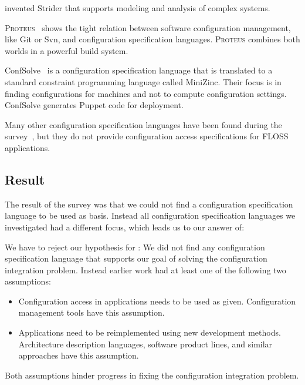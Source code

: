 \citet{lock2005strider} invented Strider that supports modeling and analysis of complex systems.

\textsc{Proteus}~\cite{tryggeseth1995modelling} shows the tight relation between software configuration management, like Git or Svn, and configuration specification languages.
\textsc{Proteus} combines both worlds in a powerful build system.

ConfSolve~\cite{hewson2011modelling,hewson2012declarative} is a configuration specification language that is translated to a standard constraint programming language called MiniZinc.
Their focus is in finding configurations for machines and not to compute configuration settings.
ConfSolve generates Puppet code for deployment.

Many other configuration specification languages have been found during the survey~\cite{roll2003towards,pandey2012investigating,hill2011modeling,anderson2002lcfg,deliverable1996tina,lujak2015orcas,sommerville1992configuration,giese2012industrial,huang2007system%
,novak2005automatic%
,gunther2012software,berger2013survey,magableh2010primitive,friedrich1999consistency}, but they do not provide configuration access specifications for FLOSS applications.

\subsection{Result}

The result of the survey was that we could not find a configuration specification language to be used as basis.
Instead all configuration specification languages we investigated had a different focus, which leads us to our answer of:
\rqBackgroundSpecificationLanguages*

\begin{finding}
We have to reject our hypothesis for :
We did not find any configuration specification language that supports our goal of solving the configuration integration problem.
Instead earlier work had at least one of the following two assumptions:
\begin{itemize}
\item Configuration access in applications needs to be used as given.
Configuration management tools have this assumption.
\item Applications need to be reimplemented using new development methods.
Architecture description languages, software product lines, and similar approaches have this assumption.
\end{itemize}
\end{finding}
\par
Both assumptions hinder progress in fixing the configuration integration problem.



















